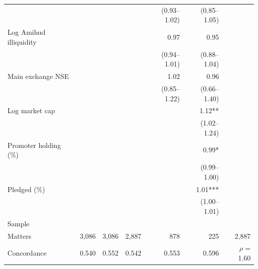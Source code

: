 \begin{tabular*}{\textwidth}[]{l@{\extracolsep\fill}rrrrrr}
 &  &  &  & (0.93--1.02) & (0.85--1.05) & \\
Log Amihud illiquidity &  &  &  & 0.97 & 0.95 & \\
 &  &  &  & (0.94--1.01) & (0.88--1.04) & \\
Main exchange NSE &  &  &  & 1.02 & 0.96 & \\
 &  &  &  & (0.85--1.22) & (0.66--1.40) & \\
Log market cap &  &  &  &  & 1.12** & \\
 &  &  &  &  & (1.02--1.24) & \\
Promoter holding (\%) &  &  &  &  & 0.99* & \\
 &  &  &  &  & (0.99--1.00) & \\
Pledged (\%) &  &  &  &  & 1.01*** & \\
 &  &  &  &  & (1.00--1.01) & \\
\midrule
\multicolumn{7}{l}{Sample}\\
Matters & 3,086 & 3,086 & 2,887 & 878 & 225 & 2,887\\
Concordance & 0.540 & 0.552 & 0.542 & 0.553 & 0.596 & $\rho$ = 1.60\\
\bottomrule
\end{tabular*}
